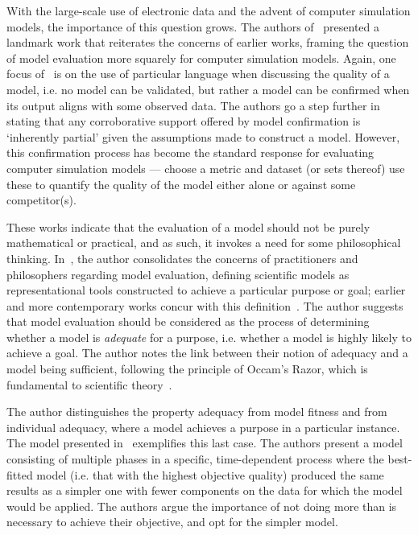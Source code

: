 With the large-scale use of electronic data and the advent of computer
simulation models, the importance of this question grows. The authors
of~\cite{Oreskes1994} presented a landmark work that reiterates the concerns of
earlier works, framing the question of model evaluation more squarely for
computer simulation models. Again, one focus of~\cite{Oreskes1994} is on the use
of particular language when discussing the quality of a model, i.e. no model can
be validated, but rather a model can be confirmed when its output aligns with
some observed data. The authors go a step further in stating that any
corroborative support offered by model confirmation is `inherently partial'
given the assumptions made to construct a model. However, this confirmation
process has become the standard response for evaluating computer simulation
models --- choose a metric and dataset (or sets thereof) use these to quantify
the quality of the model either alone or against some competitor(s).

These works indicate that the evaluation of a model should not be purely
mathematical or practical, and as such, it invokes a need for some philosophical
thinking. In~\cite{Parker2010}, the author consolidates the concerns of
practitioners and philosophers regarding model evaluation, defining scientific
models as representational tools constructed to achieve a particular purpose or
goal; earlier and more contemporary works concur with this
definition~\cite{Baumberger2017,Caswell1976,Currie2017}. The author suggests
that model evaluation should be considered as the process of determining whether
a model is \emph{adequate} for a purpose, i.e. whether a model is highly likely
to achieve a goal. The author notes the link between their notion of adequacy
and a model being sufficient, following the principle of Occam's Razor, which is
fundamental to scientific theory~\cite{Walsh1979}.

The author distinguishes the property adequacy from model fitness and from
individual adequacy, where a model achieves a purpose in a particular instance.
The model presented in~\cite{Knight2012} exemplifies this last case. The authors
present a model consisting of multiple phases in a specific, time-dependent
process where the best-fitted model (i.e. that with the highest objective
quality) produced the same results as a simpler one with fewer components on the
data for which the model would be applied. The authors argue the importance of
not doing more than is necessary to achieve their objective, and opt for the
simpler model.

